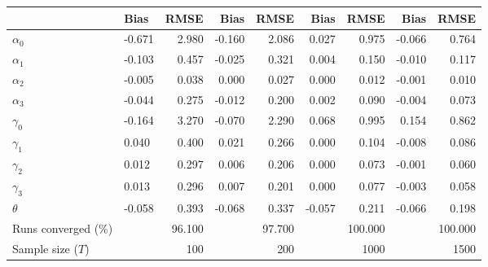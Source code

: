 
\begin{tabular}[t]{llrrrrrrr}
\toprule
  & Bias & RMSE & Bias & RMSE & Bias & RMSE & Bias & RMSE\\
\midrule
$\alpha_{0}$ & -0.671 & 2.980 & -0.160 & 2.086 & 0.027 & 0.975 & -0.066 & 0.764\\
$\alpha_{1}$ & -0.103 & 0.457 & -0.025 & 0.321 & 0.004 & 0.150 & -0.010 & 0.117\\
$\alpha_{2}$ & -0.005 & 0.038 & 0.000 & 0.027 & 0.000 & 0.012 & -0.001 & 0.010\\
$\alpha_{3}$ & -0.044 & 0.275 & -0.012 & 0.200 & 0.002 & 0.090 & -0.004 & 0.073\\
$\gamma_{0}$ & -0.164 & 3.270 & -0.070 & 2.290 & 0.068 & 0.995 & 0.154 & 0.862\\
$\gamma_{1}$ & 0.040 & 0.400 & 0.021 & 0.266 & 0.000 & 0.104 & -0.008 & 0.086\\
$\gamma_{2}$ & 0.012 & 0.297 & 0.006 & 0.206 & 0.000 & 0.073 & -0.001 & 0.060\\
$\gamma_{3}$ & 0.013 & 0.296 & 0.007 & 0.201 & 0.000 & 0.077 & -0.003 & 0.058\\
$\theta$ & -0.058 & 0.393 & -0.068 & 0.337 & -0.057 & 0.211 & -0.066 & 0.198\\
Runs converged (\%) &  & 96.100 &  & 97.700 &  & 100.000 &  & 100.000\\
Sample size ($T$) &  & 100 &  & 200 &  & 1000 &  & 1500\\
\bottomrule
\end{tabular}
